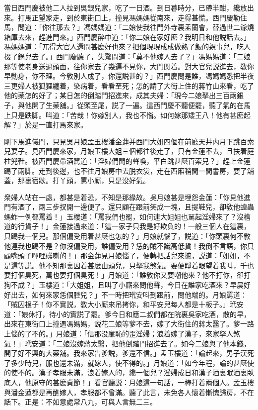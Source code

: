 當日西門慶被他二人拉到吳銀兒家，吃了一日酒。到日暮時分，已帶半酣，纔放出來。打馬正望家走，到於東街口上，撞見馮媽媽從南來，走得甚慌。西門慶勒住馬，問道：「你往那去？」馮媽媽道：「二娘使我往門外寺裏盂蘭會，替過世二爺燒箱庫去來，趕進門來。」西門慶醉中道：「你二娘在家好麽？我明日和他説話去。」馮媽媽道：「兀得大官人還問甚麽好也來？把個現現成成做熟了飯的親事兒，吃人掇了鍋兒去了。」西門慶聽了，失驚問道：「莫不他嫁人去了？」馮媽媽道：「二娘那等使老身送過頭面，往你家去了幾遍不見你，大門関着。對大官兒説進去，敎你早動身，你不理。今敎別人成了，你還説甚的？」西門慶問是誰，馮媽媽悉把半夜三更婦人被狐狸纏着，染病着，看看至死；怎的請了大街上住的蔣竹山來看，吃了他的薬怎的好了；某日怎的倒踏門招進來，成其夫婦：「現今二娘拏出三百兩銀子，與他開了生薬舖。」從頭至尾，説了一遍。這西門慶不聽便罷，聽了氣的在馬上只是跌脚。呌道：「苦哉！你嫁別人，我也不惱。如何嫁那矮王八！他有甚麽起解？」於是一直打馬來家。

剛下馬進儀門，只見吳月娘孟玉樓潘金蓮并西門大姐四個在前廳天井内月下跳百索兒耍子。見西門慶來家，月娘玉樓大姐三個都往後走了，只有金蓮不去，且扶着庭柱兜鞋。被西門慶帶酒駡道：「淫婦們閒的聲喚，平白跳甚麽百索兒？」趕上金蓮踢了兩脚。走到後邊，也不往月娘房中去脱衣裳，走在西廂稍間一間書房，要了舖蓋，那裏宿歇。打丫頭，罵小廝，只是没好氣。

衆婦人站在一處，都甚是着恐，不知是那緣故。吳月娘甚是埋怨金蓮：「你見他進門有酒了，兩三步扠開一邊便了。還只顧在跟前笑成一塊，且提鞋兒，卻敎他蝗蟲螞蚱一例都罵着！」玉樓道：「罵我們也罷，如何連大姐姐也駡起淫婦來了？沒槽道的行貨子！」金蓮接過來道：「這一家子只我是好欺負的！一般三個人在這裏，只踢我一個兒。那個偏受用着甚麽也怎的？」月娘就惱了，説道：「你頭裏何不敎他連我也踢不是？你沒偏受用，誰偏受用？恁的賊不識高低貨！我倒不言語，你只顧嘴頭子嗶哩礴喇的！」那金蓮見月娘惱了，便轉把話兒來摭，説道：「姐姐，不是這等説。他不知那裏因着甚麽由頭兒，只拏我煞氣。要便睜着眼望着我叫，千也要打個臭死，萬也要打個臭死！」月娘道：「誰敎你又要嘲他來？他不打你，卻打狗不成？」玉樓道：「大姐姐，且叫了小廝來問他聲，今日在誰家吃酒來？早晨好好出去，如何來家恁個腔兒？」不一時把玳安呌到跟前，問他端的。月娘罵道：「賊囚根子！你不實説，敎大小廝來吊拷你，和平安兒每人都是十板子。」玳安道：「娘休打，待小的實説了罷。爹今日和應二叔們都在院裏吳家吃酒，散的早，出來在東街口上撞遇馮媽媽，説花二娘等爹不去，嫁了大街住的蔣太醫了。爹一路上惱的了不的。」月娘道：「信那没廉恥的歪淫婦；浪着嫁了漢子，來家拏人煞氣！」玳安道：「二娘沒嫁蔣太醫，把他倒踏門招進去了。如今二娘與了他本錢，開了好不興的大薬舖。我來家告爹説，爹還不信。」孟玉樓道：「論起來，男子漢死了多少時兒，服也還未滿，就嫁人，使不得的。」月娘道：「如今年程，論的甚麽使的使不的。漢子孝服未滿，浪着嫁人的，纔一個兒？淫婦成日和漢子酒裏眠酒裏臥底人，他原守的甚麽貞節！」看官聽説：月娘這一句話，一棒打着兩個人。孟玉樓與潘金蓮都是再醮嫁人，孝服都不曾滿。聽了此言，未免各人懷着慚愧歸房，不在話下。正是：不如意處常八九，可與人言無二三。

